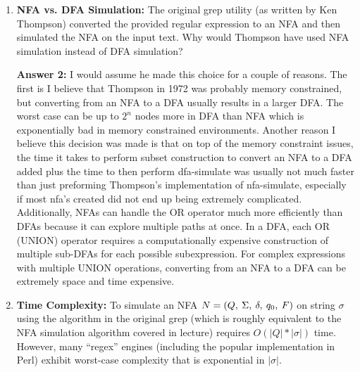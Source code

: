 \documentclass[12pt,letterpaper]{ntdhw}
\begin{document}
\begin{enumerate}
  \item \textbf{NFA vs. DFA Simulation:} The original grep utility (as
  written by Ken Thompson) converted the provided regular expression
  to an NFA and then simulated the NFA on the input text.  Why would
  Thompson have used NFA simulation instead of DFA simulation?
  \par \textbf{Answer 2:} I would assume he made this choice for a couple of reasons. The first is I believe that Thompson in 1972 was probably memory constrained, but converting from an NFA to a DFA usually results in a larger DFA. The worst case can be up to $2^n$ nodes more in DFA than NFA  which is exponentially bad in memory constrained environments. Another reason I believe this decision was made is that on top of the memory constraint issues, the time it takes to perform subset construction to convert an NFA to a DFA added plus the time to then perform dfa-simulate was usually not much faster than just preforming Thompson's implementation of nfa-simulate, especially if most nfa's created did not end up being extremely complicated. Additionally, NFAs can handle the OR operator much more efficiently than DFAs because it can explore multiple paths at once. In a DFA, each OR (UNION) operator requires a computationally expensive construction of multiple sub-DFAs for each possible subexpression. For complex expressions with multiple UNION operations, converting from an NFA to a DFA can be extremely space and time expensive.

  \item \textbf{Time Complexity:} To simulate an NFA
  $N=\lmtuple{Q}{\Sigma}{\delta}{q_0}{F}$ on string $\sigma$ using the
  algorithm in the original grep (which is roughly equivalent to the
  NFA simulation algorithm covered in lecture) requires
  $O(|Q|*|\sigma|)$ time. However, many ``regex'' engines (including the
  popular implementation in Perl) exhibit worst-case complexity that
  is exponential in $|\sigma|$.


\end{enumerate}
\end{document}
